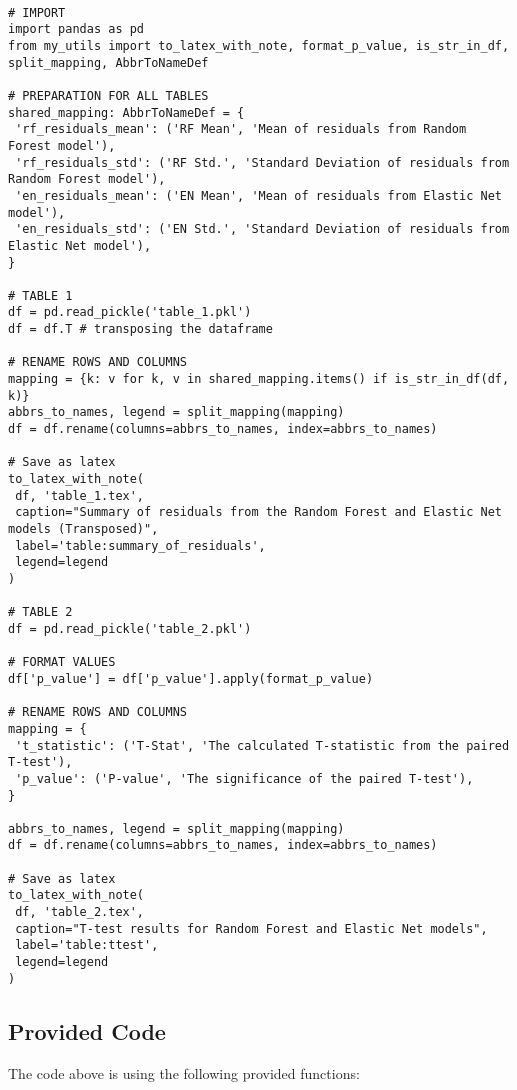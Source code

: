 \documentclass[11pt]{article}
\begin{document}
\begin{verbatim}

# IMPORT
import pandas as pd
from my_utils import to_latex_with_note, format_p_value, is_str_in_df, split_mapping, AbbrToNameDef

# PREPARATION FOR ALL TABLES
shared_mapping: AbbrToNameDef = {
 'rf_residuals_mean': ('RF Mean', 'Mean of residuals from Random Forest model'),
 'rf_residuals_std': ('RF Std.', 'Standard Deviation of residuals from Random Forest model'),
 'en_residuals_mean': ('EN Mean', 'Mean of residuals from Elastic Net model'),
 'en_residuals_std': ('EN Std.', 'Standard Deviation of residuals from Elastic Net model'),
}

# TABLE 1
df = pd.read_pickle('table_1.pkl')
df = df.T # transposing the dataframe

# RENAME ROWS AND COLUMNS
mapping = {k: v for k, v in shared_mapping.items() if is_str_in_df(df, k)}
abbrs_to_names, legend = split_mapping(mapping)
df = df.rename(columns=abbrs_to_names, index=abbrs_to_names)

# Save as latex
to_latex_with_note(
 df, 'table_1.tex',
 caption="Summary of residuals from the Random Forest and Elastic Net models (Transposed)", 
 label='table:summary_of_residuals',
 legend=legend
)

# TABLE 2
df = pd.read_pickle('table_2.pkl')

# FORMAT VALUES
df['p_value'] = df['p_value'].apply(format_p_value)

# RENAME ROWS AND COLUMNS
mapping = {
 't_statistic': ('T-Stat', 'The calculated T-statistic from the paired T-test'),
 'p_value': ('P-value', 'The significance of the paired T-test'),
}

abbrs_to_names, legend = split_mapping(mapping)
df = df.rename(columns=abbrs_to_names, index=abbrs_to_names)

# Save as latex
to_latex_with_note(
 df, 'table_2.tex',
 caption="T-test results for Random Forest and Elastic Net models", 
 label='table:ttest',
 legend=legend
)

\end{verbatim}

\subsection{Provided Code}
The code above is using the following provided functions:
\end{document}
